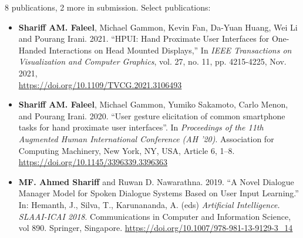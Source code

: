 \documentclass[a4paper,10pt]{article}
\begin{document}
{\begin{minipage}[t]{0.60\textwidth}
    8 publications, 2 more in submission. Select publications:
    \begin{itemize}
  \item[] \textbf{Shariff AM. Faleel}, Michael Gammon, Kevin Fan, Da-Yuan Huang, Wei Li and Pourang Irani. 2021. ``HPUI: Hand Proximate User Interfaces for One-Handed Interactions on Head Mounted Displays,'' In \textit{IEEE Transactions on Visualization and Computer Graphics}, vol. 27, no. 11, pp. 4215-4225, Nov. 2021,  \\\url{https://doi.org/10.1109/TVCG.2021.3106493}
  \item[] \textbf{Shariff AM. Faleel}, Michael Gammon, Yumiko Sakamoto, Carlo Menon, and Pourang Irani. 2020. ``User gesture elicitation of common smartphone tasks for hand proximate user interfaces''. In \textit{Proceedings of the 11th Augmented Human International Conference (AH '20)}. Association for Computing Machinery, New York, NY, USA, Article 6, 1–8. \url{https://doi.org/10.1145/3396339.3396363}
  \item[] \textbf{MF. Ahmed Shariff} and Ruwan D. Nawarathna. 2019. ``A Novel Dialogue Manager Model for Spoken Dialogue Systems Based on User Input Learning.'' In: Hemanth, J., Silva, T., Karunananda, A. (eds) \textit{Artificial Intelligence. SLAAI-ICAI 2018}. Communications in Computer and Information Science, vol 890. Springer, Singapore. \url{https://doi.org/10.1007/978-981-13-9129-3\_14}
    \end{itemize}
  \end{minipage}}
\end{document}
